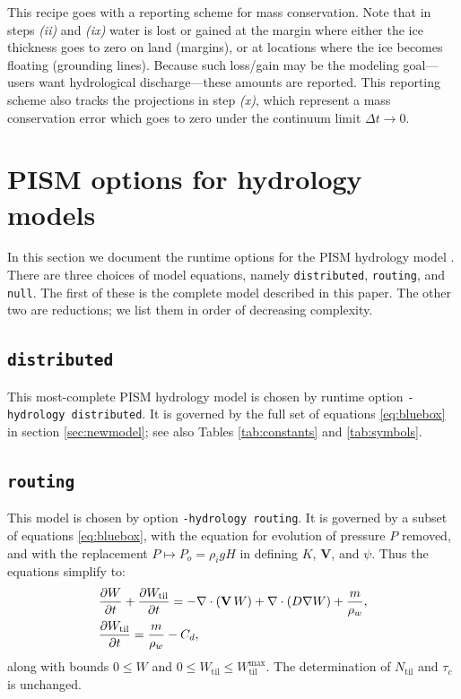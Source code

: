 \documentclass[gmd]{copernicus}   %
\newcommand{\text}{\textrm}
\newcommand\bV{\mathbf{V}}
\newcommand{\ddt}[1]{\ensuremath{\frac{\partial #1}{\partial t}}}
\newcommand{\Div}{\nabla\cdot}
\newcommand{\grad}{\nabla}
\newcommand{\Ntil}{N_{\text{til}}}
\newcommand{\Wtil}{W_{\text{til}}}
\newcommand{\Wtilmax}{W_{\text{til}}^{\text{max}}}
\begin{document}
\medskip
This recipe goes with a reporting scheme for mass conservation.  Note that in steps \emph{(ii)} and \emph{(ix)} water is lost or gained at the margin where either the ice thickness goes to zero on land (margins), or at locations where the ice becomes floating (grounding lines).  Because such loss/gain may be the modeling goal---users want hydrological discharge---these amounts are reported.  This reporting scheme also tracks the projections in step \emph{(x)}, which represent a mass conservation error which goes to zero under the continuum limit $\Delta t\to 0$.


\section{PISM options for hydrology models} \label{sec:pismdoc}

In this section we document the runtime options for the PISM hydrology model \citep{pism-user-manual}.  There are three choices of model equations, namely \texttt{distributed}, \texttt{routing}, and \texttt{null}.  The first of these is the complete model described in this paper.  The other two are reductions; we list them in order of decreasing complexity.

\subsection{\texttt{distributed}}  This most-complete PISM hydrology model is chosen by runtime option \texttt{-hydrology distributed}.  It is governed by the full set of equations \eqref{eq:bluebox} in section \ref{sec:newmodel}; see also Tables \ref{tab:constants} and \ref{tab:symbols}.

\subsection{\texttt{routing}}  This model is chosen by option \texttt{-hydrology routing}.  It is governed by a subset of equations \eqref{eq:bluebox}, with the equation for evolution of pressure $P$ removed, and with the replacement $P\mapsto P_o = \rho_i g H$ in defining $K$, $\bV$, and $\psi$.  Thus the equations simplify to:
\begin{align}
&\ddt{W} + \ddt{\Wtil} = - \Div\left(\bV\, W\right) + \Div \left(D \grad W\right) + \frac{m}{\rho_w}, \label{eq:routingmodel} \\
&\frac{\partial \Wtil}{\partial t} = \frac{m}{\rho_w} - C_d, \notag
\end{align}
along with bounds $0\le W$ and $0\le \Wtil \le \Wtilmax$.  The determination of $\Ntil$ and $\tau_c$ is unchanged.
\end{document}
